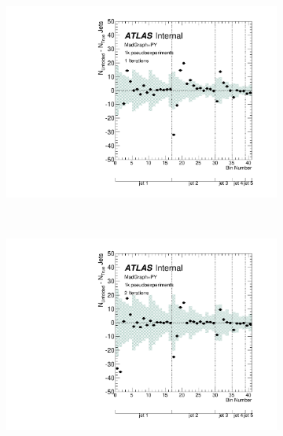 \clearpage
\begin{figure}
\begin{subfigure}[]{0.5\textwidth}
\includegraphics[width=\textwidth]{fig/Stress/110872atlfast/Bias1Iterations.pdf}
\end{subfigure}
~
\begin{subfigure}[]{0.5\textwidth}
\includegraphics[width=\textwidth]{fig/Stress/110872atlfast/Bias2Iterations.pdf}
\end{subfigure}
\\
\begin{subfigure}[]{0.5\textwidth}

\end{subfigure}
\end{figure}
